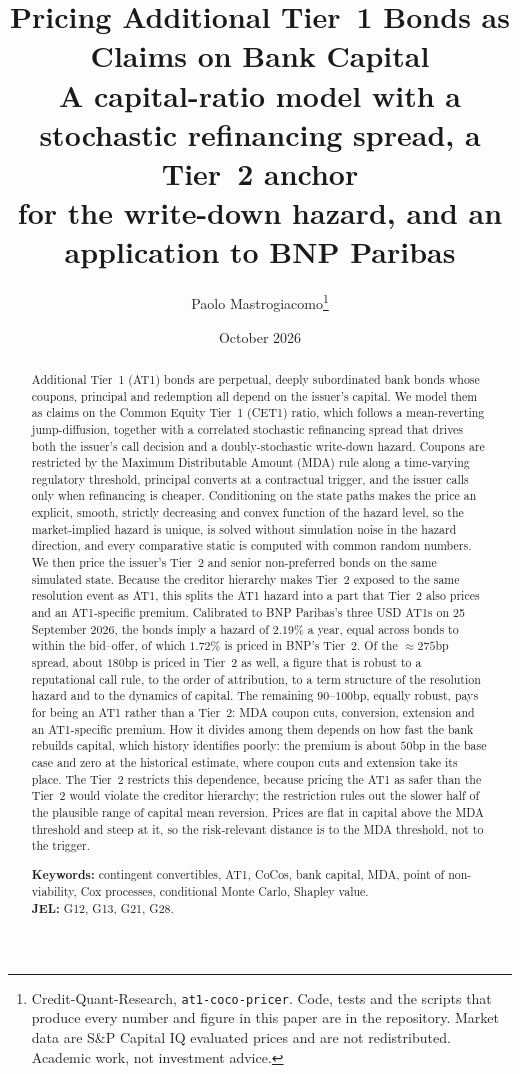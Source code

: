 \documentclass[11pt]{article}
\title{\textbf{Pricing Additional Tier~1 Bonds as Claims on Bank Capital}\\[6pt]
\large A capital-ratio model with a stochastic refinancing spread, a Tier~2 anchor\\
for the write-down hazard, and an application to BNP Paribas}
\author{Paolo Mastrogiacomo\thanks{Credit-Quant-Research, \texttt{at1-coco-pricer}.
Code, tests and the scripts that produce every number and figure in this paper are in the
repository. Market data are S\&P Capital IQ evaluated prices and are not redistributed.
Academic work, not investment advice.}}
\date{October 2026}
\theoremstyle{plain}
\theoremstyle{definition}
\theoremstyle{remark}
\newcommand{\1}{\mathbf{1}}
\begin{document}
\maketitle

\begin{abstract}
\noindent
Additional Tier~1 (AT1) bonds are perpetual, deeply subordinated bank bonds whose
coupons, principal and redemption all depend on the issuer's capital. We model them
as claims on the Common Equity Tier~1 (CET1) ratio, which follows a mean-reverting
jump-diffusion, together with a correlated stochastic refinancing spread that drives
both the issuer's call decision and a doubly-stochastic write-down hazard. Coupons are
restricted by the Maximum Distributable Amount (MDA) rule along a time-varying
regulatory threshold, principal converts at a contractual trigger, and the issuer calls
only when refinancing is cheaper. Conditioning on the state paths makes the price an
explicit, smooth, strictly decreasing and convex function of the hazard level, so the
market-implied hazard is unique, is solved without simulation noise in the hazard
direction, and every comparative static is computed with common random numbers.
We then price the issuer's Tier~2 and senior non-preferred bonds on the same simulated
state. Because the creditor hierarchy makes Tier~2 exposed to the same resolution event
as AT1, this splits the AT1 hazard into a part that Tier~2 also prices and an
AT1-specific premium. Calibrated to BNP Paribas's three USD AT1s on 25 September 2026,
the bonds imply a hazard of $2.19\%$ a year, equal across bonds to within the
bid--offer, of which $1.72\%$ is priced in BNP's Tier~2. Of the $\approx 275$bp spread,
about $180$bp is priced in Tier~2 as well, a figure that is robust to a reputational call
rule, to the order of attribution, to a term structure of the resolution hazard and to
the dynamics of capital. The remaining $90$--$100$bp, equally robust, pays for being an
AT1 rather than a Tier~2: MDA coupon cuts, conversion, extension and an AT1-specific
premium. How it divides among them depends on how fast the bank rebuilds capital, which
history identifies poorly: the premium is about $50$bp in the base case and zero at the
historical estimate, where coupon cuts and extension take its place. The Tier~2 restricts this dependence,
because pricing the AT1 as safer than the Tier~2 would violate the creditor hierarchy;
the restriction rules out the slower half of the plausible range of capital mean
reversion. Prices are flat in capital above the MDA threshold and steep at it, so the
risk-relevant distance is to the MDA threshold, not to the trigger.

\medskip\noindent
\textbf{Keywords:} contingent convertibles, AT1, CoCos, bank capital, MDA, point of
non-viability, Cox processes, conditional Monte Carlo, Shapley value.\\
\textbf{JEL:} G12, G13, G21, G28.
\end{abstract}
\end{document}
